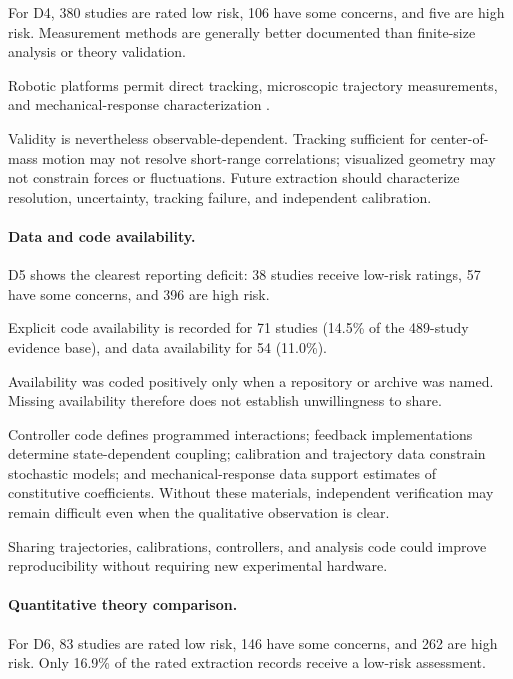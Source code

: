 For D4, 380 studies are rated low risk,
106 have some concerns, and five are
high risk. Measurement methods are
generally better documented than
finite-size analysis or theory validation.

Robotic platforms permit direct tracking,
microscopic trajectory measurements,
and mechanical-response characterization
\cite{Tarcai2011patternstransition,Buerle2020formationofstable,Chvykov2020lowrattlingapred,Brandenbourger2021limitcyclesturnac,Barone2024experimentalandnum,Hanson2025electrokineticpropu,Engbring2023anonlinearfluctuat}.

Validity is nevertheless observable-dependent.
Tracking sufficient for center-of-mass motion
may not resolve short-range correlations;
visualized geometry may not constrain
forces or fluctuations. Future extraction
should characterize resolution,
uncertainty, tracking failure,
and independent calibration.

\paragraph*{Data and code availability.}

D5 shows the clearest reporting deficit:
38 studies receive low-risk ratings,
57 have some concerns, and 396
are high risk.

Explicit code availability is recorded
for 71 studies (14.5\% of the
489-study evidence base), and data
availability for 54 (11.0\%).

Availability was coded positively only
when a repository or archive was named.
Missing availability therefore does not
establish unwillingness to share.

Controller code defines programmed
interactions; feedback implementations
determine state-dependent coupling;
calibration and trajectory data constrain
stochastic models; and mechanical-response
data support estimates of constitutive
coefficients. Without these materials,
independent verification may remain
difficult even when the qualitative
observation is clear.

Sharing trajectories, calibrations,
controllers, and analysis code
could improve reproducibility without
requiring new experimental hardware.

\paragraph*{Quantitative theory comparison.}

For D6, 83 studies are rated low risk,
146 have some concerns, and 262
are high risk. Only 16.9\% of
the rated extraction records
receive a low-risk assessment.


